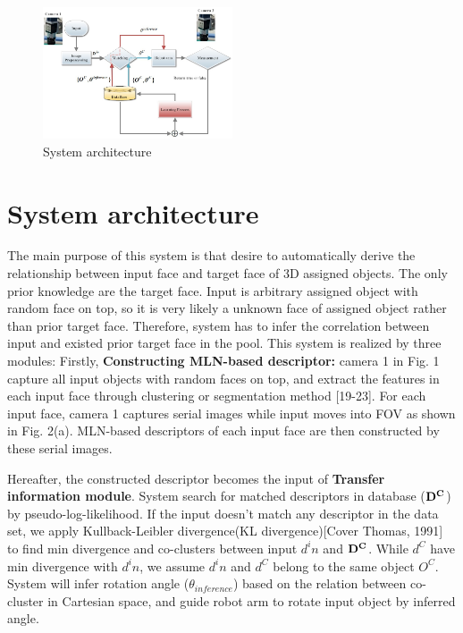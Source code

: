 \documentclass[journal]{IEEEtran}
\begin{document}
\begin{figure}[!t]
\begin{center}
\includegraphics[width=0.5\textwidth]{j_img/fig1.jpg}
\caption{System architecture}\label{test}
\end{center}
\end{figure}




\section{System architecture} 

The main purpose of this system is that desire to automatically derive the relationship between input face and target face of 3D assigned objects. The only prior knowledge are the target face. Input is arbitrary assigned object with random face on top, so it is very likely a unknown face of assigned object rather than prior target face. Therefore, system has to infer the correlation between input and existed prior target face in the pool.  This system is realized by three modules: Firstly, \textbf{Constructing MLN-based descriptor:} camera 1 in Fig. 1 capture all input objects with random faces on top, and extract the features in each input face through clustering or segmentation method [19-23]. For each input face, camera 1 captures serial images while input moves into FOV as shown in Fig. 2(a). MLN-based descriptors of each input face are then constructed by these serial images. 

Hereafter, the constructed descriptor becomes the input of \textbf{Transfer information module}. System search  for matched descriptors in database ($\bf{D^C}$) by pseudo-log-likelihood. If the input doesn't match any descriptor in the data set, we apply Kullback-Leibler divergence(KL divergence)[Cover  Thomas, 1991] to find min divergence and co-clusters between input $d^in$ and $\bf{D^C}$. While $d^C$ have min divergence with $d^in$, we assume $d^in$ and $d^C$ belong to the same object $O^C$. System will infer rotation angle ($\theta_{inference}$) based on the relation between co-cluster in Cartesian space, and guide robot arm to rotate input object by inferred angle.
\end{document}
